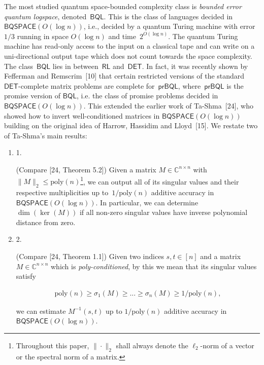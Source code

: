 \documentclass[10pt,a4paper]{article}
\begin{document}
The most studied quantum space-bounded complexity class is \emph{bounded error quantum logspace}, denoted $\mathsf{BQL}$.
This is the class of languages decided in $\mathsf{BQSPACE}(O(\log n))$, i.e., decided by a quantum Turing machine with error $1/3$ running in space $O(\log n)$ and time $2^{O(\log n)}$. The quantum Turing machine has read-only access to the input on a classical tape and can write on a uni-directional output tape which does not count towards the space complexity.
The class $\mathsf{BQL}$ lies in between $\mathsf{RL}$ and $\mathsf{DET}$.
In fact, it was recently shown by Fefferman and Remscrim [10] that certain restricted versions of the standard $\mathsf{DET}$-complete matrix problems are complete for $\mathsf{prBQL}$, where $\mathsf{prBQL}$ is the promise version of $\mathsf{BQL}$, i.e. the class of promise problems decided in $\mathsf{BQSPACE}(O(\log n))$.
This extended the earlier work of Ta-Shma [24], who showed how to invert well-conditioned matrices in $\mathsf{BQSPACE}(O(\log n))$ building on the original idea of Harrow, Hassidim and Lloyd [15].
We restate two of Ta-Shma’s main results:\par


\begin{enumerate}


\item[] 
1. 


(Compare [24, Theorem 5.2])
Given a matrix $M\in\mathbb{C}^{n\times n}$ with $\|M\|_{2}\leq\mathrm{poly}(n)$\footnote{Throughout this paper, $\|\cdot\|_{2}$ shall always denote the $\ell_{2}$-norm of a vector or the spectral norm of a matrix.}, we can output all of its singular values and their respective multiplicities up to $1/\mathrm{poly}(n)$ additive accuracy in $\mathsf{BQSPACE}(O(\log n))$. In particular, we can determine $\dim(\ker(M))$ if all non-zero singular values have inverse polynomial distance from zero.\par





\item[] 
2. 


(Compare [24, Theorem 1.1])
Given two indices $s,t\in[n]$ and a matrix $M\in\mathbb{C}^{n\times n}$ which is \emph{poly-conditioned}, by this we mean that its singular values satisfy\par


\[\begin{gathered}
\displaystyle\mathrm{poly}(n)\geq\sigma_{1}(M)\geq...\geq\sigma_{n}(M)\geq 1/\mathrm{poly}(n),
\end{gathered}\]


we can estimate $M^{-1}(s,t)$ up to $1/\mathrm{poly}(n)$ additive accuracy in $\mathsf{BQSPACE}(O(\log n))$.\par





\end{enumerate}
\end{document}
